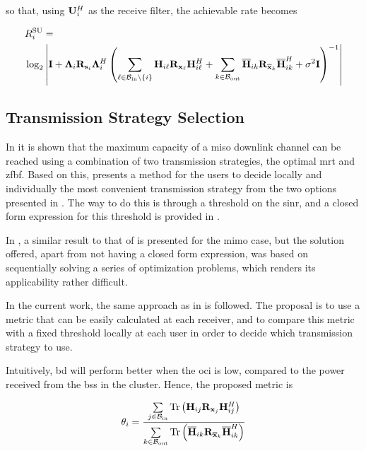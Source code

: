 \noindent
so that, using $\mathbf{U}_i^H$ as the receive filter, the achievable rate becomes

\begin{equation} \label{eq:rate_su}
\begin{aligned}
    &R_i^{\text{SU}} = \\
    &\log_2\left|\mathbf{I} + \mathbf{\Lambda}_i \mathbf{R}_{\mathbf{s}_i} \mathbf{\Lambda}_i^H \left(
    \sum\limits_{\ell \in \mathcal{B}_{\text{in}} \backslash \left\{i\right\}} \mathbf{H}_{i\ell}
    \mathbf{R}_{\mathbf{x}_{\ell}} \mathbf{H}_{i\ell}^H + \sum\limits_{k \in \mathcal{B}_{\text{out}}} \mathbf{\overline{H}}_{ik}
    \mathbf{R}_{\mathbf{\overline{x}}_k} \mathbf{\overline{H}}_{ik}^H + \sigma^2 \mathbf{I} \right)^{-1} \right|
\end{aligned}
\end{equation}

\subsection{Transmission Strategy Selection} \label{ssec:sched_selection}

In \cite{zhang10} it is shown that the maximum capacity of a \gls{miso} downlink
channel can be reached using a combination of two transmission strategies, the
optimal \gls{mrt} and \gls{zfbf}. Based on this, \cite{moon13} presents a method
for the users to decide locally and individually the most convenient
transmission strategy from the two options presented in \cite{zhang10}. The way
to do this is through a threshold on the \gls{sinr}, and a closed form
expression for this threshold is provided in \cite{moon13}.

In \cite{zuleita09}, a similar result to that of \cite{zhang10} is presented for
the \gls{mimo} case, but the solution offered, apart from not having a closed
form expression, was based on sequentially solving a series of optimization
problems, which renders its applicability rather difficult.

In the current work, the same approach as in \cite{moon13} is followed. The
proposal is to use a metric that can be easily calculated at each receiver, and
to compare this metric with a fixed threshold locally at each user in order to
decide which transmission strategy to use.

Intuitively, \gls{bd} will perform better when the \gls{oci} is low, compared to
the power received from the \glspl{bs} in the cluster. Hence, the proposed
metric is

\begin{equation} \label{eq:metric}
   \theta_i =
   \frac{\sum\limits_{j \in \mathcal{B}_{\text{in}}} \operatorname*{Tr}\left(\mathbf{H}_{ij}\mathbf{R}_{\mathbf{x}_j}\mathbf{H}_{ij}^H\right)}
   {\sum\limits_{k \in \mathcal{B}_{\text{out}}} \operatorname*{Tr}\left(\mathbf{\overline{H}}_{ik}\mathbf{R}_{\mathbf{\overline{x}}_k}\mathbf{\overline{H}}_{ik}^H
   \right)}
\end{equation}

